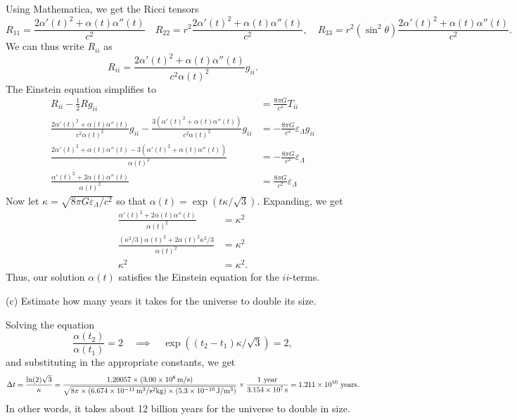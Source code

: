 \documentclass{../../templates/lkx_pset}
\begin{document}
\begin{parts}
  Using Mathematica, we get the Ricci tensors
  \[
    R_{11} = \frac{2\alpha'(t)^2 + \alpha(t)\alpha''(t)}{c^2} \quad R_{22} = r^2 \frac{2\alpha'(t)^2 + \alpha(t)\alpha''(t)}{c^2}, \quad R_{33} = r^2(\sin^2\theta) \frac{2\alpha'(t)^2 + \alpha(t)\alpha''(t)}{c^2}. 
  \]
  We can thus write $R_{ii}$ as
  \[
    R_{ii} = \frac{2\alpha'(t)^2 + \alpha(t)\alpha''(t)}{c^2\alpha(t)^2} g_{ii}.
  \]
  The Einstein equation simplifies to
  \[
    \begin{aligned}
      R_{ii} - \frac{1}{2} R g_{ii} 
      &= \frac{8\pi G}{c^4} T_{ii}\\
      \frac{2\alpha'(t)^2 + \alpha(t)\alpha''(t)}{c^2\alpha(t)^2} g_{ii} - \frac{3(\alpha'(t)^2 + \alpha(t)\alpha''(t))}{c^2\alpha(t)^2}g_{ii} 
      &= -\frac{8\pi G}{c^4} \varepsilon_{\Lambda} g_{ii}\\
      \frac{2\alpha'(t)^2 + \alpha(t)\alpha''(t) - 3(\alpha'(t)^2 + \alpha(t)\alpha''(t))}{\alpha(t)^2}
      &= -\frac{8\pi G}{c^2} \varepsilon_{\Lambda} \\
      \frac{\alpha'(t)^2 + 2\alpha(t)\alpha''(t)}{\alpha(t)^2}
      &= \frac{8\pi G}{c^2} \varepsilon_{\Lambda}
    \end{aligned}
  \]
  Now let $\kappa = \sqrt{8\pi G\varepsilon_\Lambda / c^2}$ so that $\alpha(t) = \exp(t\kappa/\sqrt{3})$. Expanding, we get
  \[
    \begin{aligned}
      \frac{\alpha'(t)^2 + 2\alpha(t)\alpha''(t)}{\alpha(t)^2} 
      &= \kappa^2\\
      \frac{(\kappa^2/3) \alpha(t)^2 + 2\alpha(t)^2 \kappa^2/3}{\alpha(t)^2} &= \kappa^2\\
      \kappa^2&=\kappa^2.
    \end{aligned}
  \]
  Thus, our solution $\alpha(t)$ satisfies the Einstein equation for the $ii$-terms.

\begin{part}{(c)}
  Estimate how many years it takes for the universe to double its size.
\end{part}

Solving the equation
\[
  \frac{\alpha(t_2)}{\alpha(t_1)} = 2 \quad\implies\quad \exp((t_2-t_1)\kappa/\sqrt{3}) = 2,
\]
and substituting in the appropriate constants, we get
\[
  \Delta t = \frac{\ln(2)\sqrt{3}}{\kappa}
  = \frac{1.20057\times (\mpssi{3.00e8})}{\sqrt{8\pi \times (\Gsi{6.674e-11})\times (\desi{5.3e-10})}}\times \frac{1\textrm{ year}}{\ssi{3.154e7}} = 1.211\times10^{10}\textrm{ years}.
\]
In other words, it takes about 12 billion years for the universe to double in size.
\end{parts}
\end{document}
